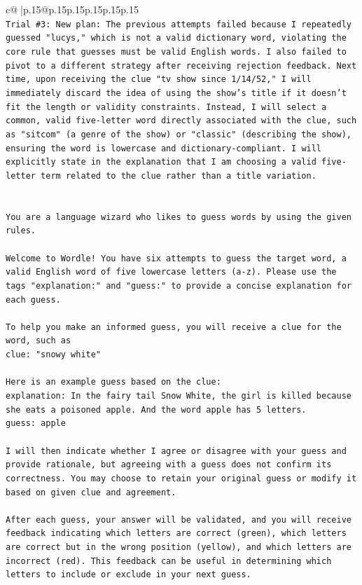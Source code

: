 \documentclass{article}
\begin{document}
{\begin{supertabular}{c@{$\;$}|p{.15\linewidth}@{}p{.15\linewidth}p{.15\linewidth}p{.15\linewidth}p{.15\linewidth}p{.15\linewidth}}
{{{\\ 
\texttt{Trial \#3: New plan: The previous attempts failed because I repeatedly guessed "lucys," which is not a valid dictionary word, violating the core rule that guesses must be valid English words. I also failed to pivot to a different strategy after receiving rejection feedback. Next time, upon receiving the clue "tv show since 1/14/52," I will immediately discard the idea of using the show's title if it doesn't fit the length or validity constraints. Instead, I will select a common, valid five{-}letter word directly associated with the clue, such as "sitcom" (a genre of the show) or "classic" (describing the show), ensuring the word is lowercase and dictionary{-}compliant. I will explicitly state in the explanation that I am choosing a valid five{-}letter term related to the clue rather than a title variation.} \\
\\ 
\\ 
\texttt{You are a language wizard who likes to guess words by using the given rules.} \\
\\ 
\texttt{Welcome to Wordle! You have six attempts to guess the target word, a valid English word of five lowercase letters (a{-}z). Please use the tags "explanation:" and "guess:" to provide a concise explanation for each guess.} \\
\\ 
\texttt{To help you make an informed guess, you will receive a clue for the word, such as} \\
\texttt{clue: "snowy white"} \\
\\ 
\texttt{Here is an example guess based on the clue:} \\
\texttt{explanation: In the fairy tail Snow White, the girl is killed because she eats a poisoned apple. And the word apple has 5 letters.} \\
\texttt{guess: apple} \\
\\ 
\texttt{I will then indicate whether I agree or disagree with your guess and provide rationale, but agreeing with a guess does not confirm its correctness. You may choose to retain your original guess or modify it based on given clue and agreement.} \\
\\ 
\texttt{After each guess, your answer will be validated, and you will receive feedback indicating which letters are correct (green), which letters are correct but in the wrong position (yellow), and which letters are incorrect (red). This feedback can be useful in determining which letters to include or exclude in your next guess.} \\
}}}
\end{supertabular}}
\end{document}
